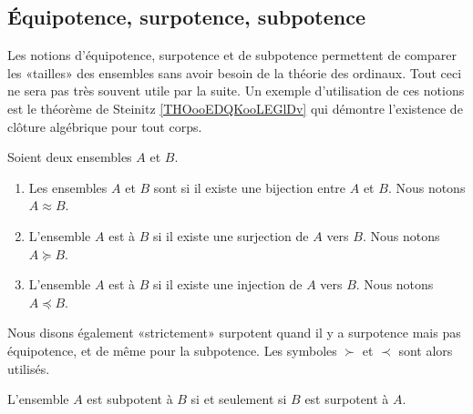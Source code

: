 \subsection{Équipotence, surpotence, subpotence}
\label{SUBooEquiSurSubpotence}

\begin{normaltext}	\label{NORMooEquiSurSubpotence}
	Les notions d'équipotence, surpotence et de subpotence permettent de comparer les «tailles» des ensembles sans avoir besoin de la théorie des ordinaux. Tout ceci ne sera pas très souvent utile par la suite. Un exemple d'utilisation de ces notions est le théorème de Steinitz \ref{THOooEDQKooLEGlDv} qui démontre l'existence de clôture algébrique pour tout corps.
\end{normaltext}

\begin{definition}      \label{DEFooXGXZooIgcBCg}
	Soient deux ensembles \( A\) et \( B\).
	\begin{enumerate}
		\item
		      Les ensembles \( A\) et \( B\) sont  si il existe une bijection entre \( A\) et \( B\). Nous notons \( A\approx B\).
		\item
		      L'ensemble \( A\) est  à \( B\) si il existe une surjection de \( A\) vers \( B\). Nous notons \( A\succeq B\).
		\item
		      L'ensemble \( A\) est  à \( B\) si il existe une injection de \( A\) vers \( B\). Nous notons \( A\preceq B\).
	\end{enumerate}
	Nous disons également «strictement» surpotent quand il y a surpotence mais pas équipotence, et de même pour la subpotence. Les symboles \( \succ\) et \( \prec\) sont alors utilisés.
\end{definition}

\begin{proposition}      \label{PROPooWSXTooMQPcNG}
	L'ensemble \( A\) est subpotent à \( B\) si et seulement si \( B\) est surpotent à \( A\).
\end{proposition}

